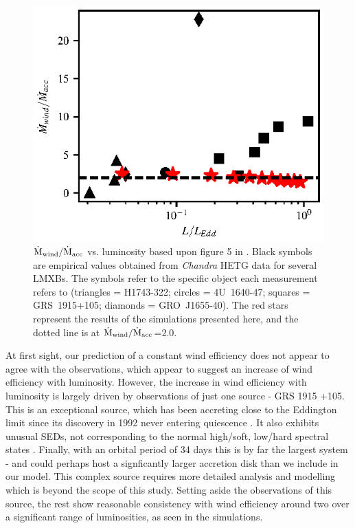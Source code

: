 \documentclass[a4paper,fleqn,usenatbib]{mnras}
\begin{document}
\begin{figure}
\includegraphics[width=\columnwidth]{figures/ponti.eps}
\caption{$\rm{\dot{M}_{wind}/\dot{M}_{acc}}$ vs. luminosity based upon figure 5 in \citet{2012MNRAS.422L..11P}. 
Black symbols are empirical values obtained from {\em Chandra} HETG data for several LMXBs. 
The symbols refer to the specific object each measurement refers to 
(triangles = H1743-322; circles = 4U~1640-47; squares = GRS~1915+105; diamonds = GRO~J1655-40). 
The red stars represent the results of the simulations presented here, and the dotted line
is at $\rm{\dot{M}_{wind}/\dot{M}_{acc}}$=2.0.}
\label{figure:mdot_vs_lum}
\end{figure}

At first sight, our prediction of a constant wind efficiency does not appear to
agree with the observations, which appear to suggest an increase of wind efficiency with
luminosity. However, the increase in wind efficiency with luminosity is largely driven 
by observations of just one source - GRS 1915 +105.  This is an exceptional source, which has been 
accreting close to the Eddington limit since its discovery in 1992  never
entering quiescence \citep{1994ApJS...92..469C,2017MNRAS.468.4748C}. 
It also exhibits unusual SEDs, not corresponding to the normal high/soft,
low/hard spectral states \citep{2016ApJ...833..165Z}. Finally, with an orbital period of 34 days 
\citep{2014SSRv..183..223C} this is by far the largest system - and could perhaps host a signficantly
larger accretion disk than we include in our model. This complex source requires more detailed
analysis and modelling which is beyond the scope of this study. Setting aside the observations of this
source, the rest show reasonable consistency with wind efficiency around two over a significant 
range of luminosities, as seen in the simulations.
\end{document}
